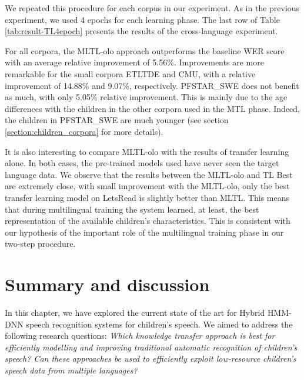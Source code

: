 We repeated this procedure for each corpus in our experiment. As in the previous experiment, we used 4 epochs for each learning phase. The last row of Table \ref{tab:result-TL4epoch} presents the results of the cross-language experiment.

For all corpora, the \ac{MLTL-olo} approach outperforms the baseline \ac{WER} score with an average relative improvement of 5.56\%. Improvements are more remarkable for the small corpora ETLTDE and CMU, with a  relative improvement of 14.88\% and 9.07\%, respectively. PFSTAR\_SWE does not benefit as much, with only 5.05\% relative improvement. This is mainly due to the age differences with the children in the other corpora used in the \ac{MTL} phase. Indeed, the children in PFSTAR\_SWE are much younger (see section  \ref{section:children_corpora} for more details). %

It is also interesting to compare \ac{MLTL-olo} with the results of transfer learning alone. In both cases, the pre-trained models used have never seen the target language data. We observe that the results between the \ac{MLTL-olo} and \ac{TL} Best are extremely close, with small improvement with the \ac{MLTL-olo}, only the best transfer learning model on LetsRead is slightly better than \ac{MLTL}. This means that during multilingual training the system learned, at least, the best representation of the available children's characteristics. This is consistent with our hypothesis of the important role of the multilingual training phase in our two-step procedure.

\section{Summary and discussion}
In this chapter, we have explored the current state of the art for Hybrid \ac{HMM-DNN} speech recognition systems for children's speech. We aimed to address the following research questions: \textit{Which knowledge transfer approach is best for efficiently modelling and improving traditional automatic recognition of children's speech? Can these approaches be used to efficiently exploit low-resource children's speech data from multiple languages?}

